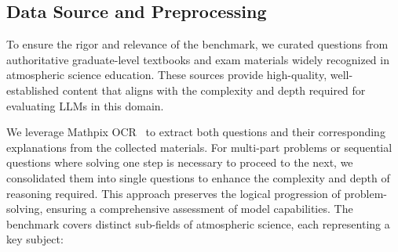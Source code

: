 


\subsection{Data Source and Preprocessing}



To ensure the rigor and relevance of the benchmark, we curated questions from authoritative graduate-level textbooks and exam materials widely recognized in atmospheric science education. These sources provide high-quality, well-established content that aligns with the complexity and depth required for evaluating LLMs in this domain.

We leverage Mathpix OCR~\cite{mathpix} to extract both questions and their corresponding explanations from the collected materials. For multi-part problems or sequential questions where solving one step is necessary to proceed to the next, we consolidated them into single questions to enhance the complexity and depth of reasoning required. This approach preserves the logical progression of problem-solving, ensuring a comprehensive assessment of model capabilities.
The benchmark covers distinct sub-fields of atmospheric science, each representing a key subject:


